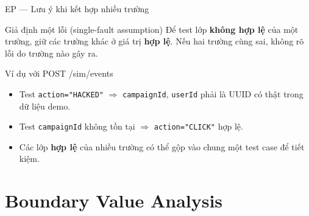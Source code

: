 \documentclass[aspectratio=169,12pt]{beamer}
\begin{document}
\begin{frame}{EP --- Lưu ý khi kết hợp nhiều trường}
  \begin{alertblock}{Giả định một lỗi (single-fault assumption)}
    Để test lớp \textbf{không hợp lệ} của một trường, giữ các trường khác
    ở giá trị \textbf{hợp lệ}. Nếu hai trường cùng sai, không rõ lỗi do
    trường nào gây ra.
  \end{alertblock}

  \vspace{0.4em}
  \begin{exampleblock}{Ví dụ với POST /sim/events}
    \small
    \begin{itemize}
      \item Test \texttt{action="HACKED"} $\Rightarrow$ \texttt{campaignId},
        \texttt{userId} phải là UUID có thật trong dữ liệu demo.
      \item Test \texttt{campaignId} không tồn tại $\Rightarrow$
        \texttt{action="CLICK"} hợp lệ.
      \item Các lớp \textbf{hợp lệ} của nhiều trường có thể gộp vào chung
        một test case để tiết kiệm.
    \end{itemize}
  \end{exampleblock}
\end{frame}

\section{Boundary Value Analysis}
\end{document}

